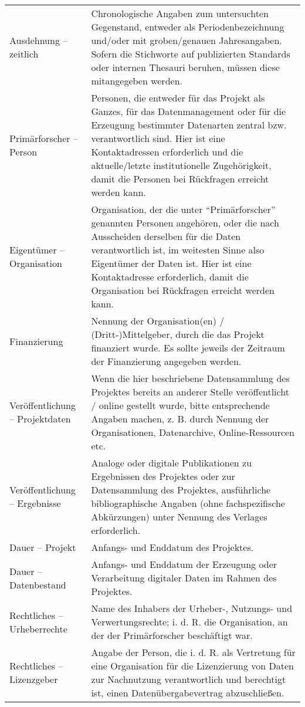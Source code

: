 \begin{center}
\begin{longtable}{L{0.25\textwidth} p{0.68\textwidth}}
		Ausdehnung -- zeitlich & Chronologische Angaben zum untersuchten Gegenstand, entweder als Periodenbezeichnung und/oder mit groben/genauen Jahresangaben. Sofern die Stichworte auf publizierten Standards oder internen Thesauri beruhen, müssen diese mitangegeben werden.\\
		Primärforscher -- Person & Personen, die entweder für das Projekt als Ganzes, für das Datenmanagement oder für die Erzeugung bestimmter Datenarten zentral bzw. verantwortlich sind. Hier ist eine Kontaktadressen erforderlich und die aktuelle/letzte institutionelle Zugehörigkeit, damit die Personen bei Rückfragen erreicht werden kann.\\
		Eigentümer -- Organisation & Organisation, der die unter "`Primärforscher"' genannten Personen angehören, oder die nach Ausscheiden derselben für die Daten verantwortlich ist, im weitesten Sinne also Eigentümer der Daten ist. Hier ist eine Kontaktadresse erforderlich, damit die Organisation bei Rückfragen erreicht werden kann.\\
		Finanzierung & Nennung der Organisation(en) / (Dritt-)Mittelgeber, durch die das Projekt finanziert wurde. Es sollte jeweils der Zeitraum der Finanzierung angegeben werden.\\
		Veröffentlichung -- Projektdaten & Wenn die hier beschriebene Datensammlung des Projektes bereits an anderer Stelle veröffentlicht / online gestellt wurde, bitte entsprechende Angaben machen, z. B. durch Nennung der Organisationen, Datenarchive, Online-Ressourcen etc.\\
		Veröffentlichung -- Ergebnisse & Analoge oder digitale Publikationen zu Ergebnissen des Projektes oder zur Datensammlung des Projektes, ausführliche bibliographische Angaben (ohne fachspezifische Abkürzungen) unter Nennung des Verlages erforderlich.\\
		Dauer -- Projekt & Anfangs- und Enddatum des Projektes.\\
		Dauer -- Datenbestand & Anfangs- und Enddatum der Erzeugung oder Verarbeitung digitaler Daten im Rahmen des Projektes.\\
		Rechtliches -- Urheberrechte & Name des Inhabers der Urheber-, Nutzungs- und Verwertungsrechte; i. d. R. die Organisation, an der der Primärforscher beschäftigt war.\\
		Rechtliches -- Lizenzgeber & Angabe der Person, die i. d. R. als Vertretung für eine Organisation für die Lizenzierung von Daten zur Nachnutzung verantwortlich und berechtigt ist, einen Datenübergabevertrag abzuschließen.\\

\end{longtable}
\end{center}
